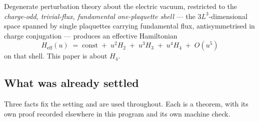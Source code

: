 \documentclass[11pt]{article}
\theoremstyle{definition}
\theoremstyle{remark}
\begin{document}
Degenerate perturbation theory about the electric vacuum, restricted to the
\emph{charge-odd, trivial-flux, fundamental one-plaquette shell} --- the
$3L^3$-dimensional space spanned by single plaquettes carrying fundamental flux,
antisymmetrised in charge conjugation --- produces an effective Hamiltonian
\begin{equation}\label{eq:eff}
  H_{\mathrm{eff}}(u)\;=\;\text{const}\;+\;u^2H_2\;+\;u^3H_3\;+\;u^4H_4\;+\;O(u^5)
\end{equation}
on that shell. This paper is about $H_4$.

\subsection{What was already settled}

Three facts fix the setting and are used throughout. Each is a theorem, with
its own proof recorded elsewhere in this program and its own machine check.
\end{document}
